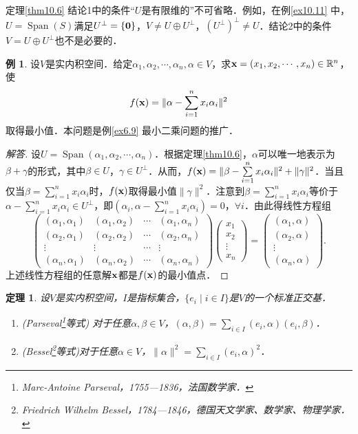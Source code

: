 \documentclass[a4paper,fontset=windows]{ctexbook}
\newtheorem{theorem}{定理}[chapter]
\theoremstyle{definition}
\newtheorem{example}{例}[chapter]
\DeclareMathOperator{\Span}{Span}
\def\note{\noindent\raisebox{10pt}{\dbend}\hspace{7pt}}
\begin{document}
\note 定理\ref{thm10.6} 结论1中的条件“$U$是有限维的”不可省略．例如，在例\ref{ex10.11} 中，$U=\Span(S)$满足$U^\perp=\{{\bf 0}\}$，$V\ne U\oplus U^\perp$，$(U^\perp)^\perp\ne U$．结论2中的条件$V=U\oplus U^\perp$也不是必要的．

\begin{example}\label{ex10.13}
设$V$是实内积空间．给定$\alpha_1,\alpha_2,\cdots,\alpha_n,\alpha\in V$，求${\bf x}=(x_1,x_2,\cdots,x_n)\in\mathbb{R}^n$，使
$$f({\bf x})=\|\alpha-\sum_{i=1}^nx_i\alpha_i\|^2$$
取得最小值．本问题是例\ref{ex6.9} 最小二乘问题的推广．
\end{example}

\begin{proof}[解答]
设$U=\Span(\alpha_1,\alpha_2,\cdots,\alpha_n)$．根据定理\ref{thm10.6}，$\alpha$可以唯一地表示为$\beta+\gamma$的形式，其中$\beta\in U$，$\gamma\in U^\perp$．从而，$f({\bf x})=\|\beta-\sum\limits_{i=1}^nx_i\alpha_i\|^2+\|\gamma\|^2$．当且仅当$\beta=\sum\limits_{i=1}^nx_i\alpha_i$时，$f({\bf x})$取得最小值$\|\gamma\|^2$．注意到$\beta=\sum\limits_{i=1}^nx_i\alpha_i$等价于$\alpha-\sum\limits_{i=1}^nx_i\alpha_i\in U^\perp$，即$(\alpha_i,\alpha-\sum\limits_{i=1}^nx_i\alpha_i)=0$，$\forall i$．由此得线性方程组
$$\begin{pmatrix}(\alpha_1,\alpha_1)&(\alpha_1,\alpha_2)&\cdots&(\alpha_1,\alpha_n) \\ (\alpha_2,\alpha_1)&(\alpha_2,\alpha_2)&\cdots&(\alpha_2,\alpha_n) \\ \vdots&\vdots&\cdots&\vdots \\ (\alpha_n,\alpha_1)&(\alpha_n,\alpha_2)&\cdots&(\alpha_n,\alpha_n)\end{pmatrix}\begin{pmatrix}x_1 \\ x_2 \\ \vdots \\ x_n\end{pmatrix}=\begin{pmatrix}(\alpha_1,\alpha) \\ (\alpha_2,\alpha) \\ \vdots \\ (\alpha_n,\alpha)\end{pmatrix}.$$
上述线性方程组的任意解${\bf x}$都是$f({\bf x})$的最小值点．
\end{proof}

\begin{theorem}
设$V$是实内积空间，$I$是指标集合，$\{e_i\mid i\in I\}$是$V$的一个标准正交基．
\begin{enumerate}
\item {\rm(Parseval\footnote{Marc-Antoine Parseval，1755—1836，法国数学家．}等式)} 对于任意$\alpha,\beta\in V$，$(\alpha,\beta)=\sum\limits_{i\in I}(e_i,\alpha)(e_i,\beta)$．

\item {\rm(Bessel\footnote{Friedrich Wilhelm Bessel，1784—1846，德国天文学家、数学家、物理学家．}等式)}\hspace{14pt}对于任意$\alpha\in V$，$\|\alpha\|^2=\sum\limits_{i\in I}(e_i,\alpha)^2$．
\end{enumerate}
\end{theorem}
\end{document}
